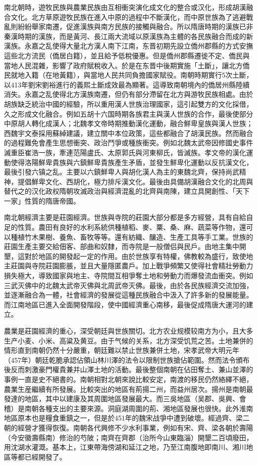 南北朝時，遊牧民族與農業民族由互相衝突演化成文化的整合或汉化，形成胡漢融合文化。北方草原遊牧民族在進入中原的過程中不斷漢化，而中原世族為了逃避戰亂則紛紛舉家南遷，促進漢族與南方民族的接觸與融合。所以隋唐時期的漢族已非秦漢時期的漢族，而是黃河、長江兩大流域以原漢族為主體的各民族融合而成的新漢族。永嘉之乱使得大量北方漢人南下江南，东晋初期先設立僑州郡縣的方式安撫這些北方流民（僑居白籍），並且給予低稅優惠。但是僑州郡縣遷徙不定、僑民與當地人民混雜，影響了政府賦稅收入。於是在东晋中後期實施「土斷」，讓北方僑民就地入籍（在地黃籍），與當地人民共同負擔國家賦役。南朝時期實行5次土斷，以413年劉宋劉裕進行的義熙土斷成效最為顯著。這導致南朝境內的僑居州縣陸續消失。永嘉之乱使得北方漢族南遷，但仍有部分滯留在北方與游牧民族相處。由於胡族缺乏統治中國的經驗，所以重用漢人世族治理國家，這引起雙方的文化採借，久之形成文化融合。例如五胡十六国時期各族君主與漢人世族的合作，最後使部分中原胡人轉化成漢人；北魏孝文帝時期推動漢化運動，融合鮮卑皇族與漢人世族；西魏宇文泰採用蘇綽建議，建立關中本位政策，這些都融合了胡漢民族。然而融合的過程難免會產生思想衝突、政治鬥爭或種族衝突。例如北魏太武帝因修國史事件滅重臣崔浩一族，牽連范陽盧氏、太原郭氏與河東柳氏，皆滅族。孝文帝的漢化運動使得洛陽鮮卑貴族與六鎮鮮卑貴族產生矛盾，並發生鮮卑化運動以反抗漢文化，最後引發六镇之乱。主要以六鎮鮮卑人與胡化漢人為主的東魏北齊，保持尚武精神，提倡鮮卑文化、西胡化，極力排斥漢文化。最後由具備胡漢融合文化的北周與替代之的汉化政权隋朝攻滅政治與經濟混亂的北齊與南陳，建立具開創性、「天下一家」性質的隋唐帝國。

南北朝經濟主要是莊園經濟。世族與寺院的莊園大部分都是多方經營，具有自給自足的性質。農田有良好的水利系統供種植稻、麥、粟、桑、麻、蔬菜等作物，還可以種植竹木果樹、養魚、畜牧等等。還有紡織、釀造、生產工具等手工業。世族的莊園生產主要交給佃客、部曲和奴隸，而寺院是一般僧侣與民戶。由地主集中開墾，這對於地區的開發起一定的作用。由於世族享有特權，佛教較為盛行，致使地主莊園與寺院莊園膨脹，並且大量隱匿農戶。加上戰爭頻繁又使得社會精壯勞動力損失極大，導致國家與地主、寺院間互相爭奪土地和勞動力而爆發流血衝突。例如三武灭佛中的北魏太武帝灭佛與北周武帝灭佛。最後，由於各民族經濟交流加強，並逐漸融合為一體，社會經濟的發展從這種民族融合中汲入了許多新的發展能量。而江南地區已進入全面開發階段，使中國經濟重心南移，最後促成隋唐大運河的建立。

農業是莊園經濟的重心，深受朝廷與世族關切。北方农业规模较南方为小，且大多生产小麦、小米、高粱及黄豆。由于气候的关系，北方深受饥荒之苦。土地兼併的情形直到南朝仍然十分嚴重，朝廷難以禁止世族兼併土地，宋孝武帝大明元年（457年）朝廷乾脆承認佔領山林川澤的法令以限制世族搶佔範圍。然而法令頒布後反而刺激豪門權貴兼并山澤土地的活動。最後整個南朝在佔田奪土、兼山並澤的事例一直是史不絕書的。南朝相對北朝來說比較安定，南渡的移民仍然絡繹不絕，農業生産繼續有所發展。比較突出的地區有荊揚二州，而益州居次。揚州是南朝最發達的地區，其中以建康及其周圍地區發展最大。而三吳地區（吴郡、吳興、會稽）是南朝各種支出的主要來源。洞庭湖周圍的荊、湘地區發展也很快。此外淮南地區原本也是糧食重鎮之一，但是於451年的魏宋战爭中遭到破壞。經過齊、梁二朝的經營才獲得恢復。南朝各代興修不少水利事業，例如有宋、齊、梁各朝於壽陽（今安徽壽縣南）修治的芍陂；南齊在齊郡（治所今山東臨淄）開墾二百頃廢田，用沈湖水灌溉。基本上，江東帶海傍湖和延江之地，乃至江南腹地即南川、湘川地區等都已經開發了。

